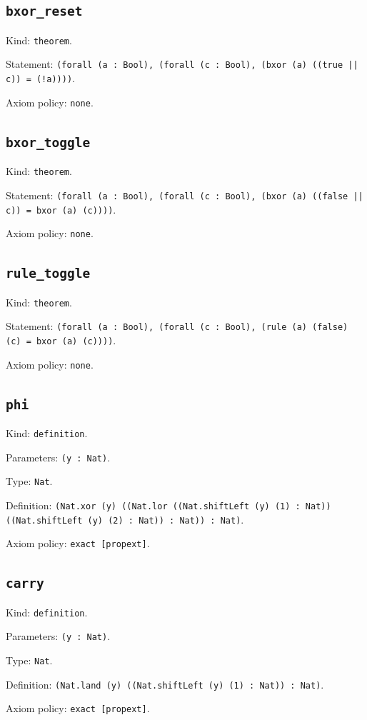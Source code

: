 \documentclass[11pt]{article}
\begin{document}
\subsection*{\texttt{bxor\_reset}}
\noindent Kind: \texttt{theorem}.\par
\noindent Statement: \texttt{(forall (a : Bool), (forall (c : Bool), (bxor (a) ((true || c)) = (!a))))}.\par
\noindent Axiom policy: \texttt{none}.\par
\subsection*{\texttt{bxor\_toggle}}
\noindent Kind: \texttt{theorem}.\par
\noindent Statement: \texttt{(forall (a : Bool), (forall (c : Bool), (bxor (a) ((false || c)) = bxor (a) (c))))}.\par
\noindent Axiom policy: \texttt{none}.\par
\subsection*{\texttt{rule\_toggle}}
\noindent Kind: \texttt{theorem}.\par
\noindent Statement: \texttt{(forall (a : Bool), (forall (c : Bool), (rule (a) (false) (c) = bxor (a) (c))))}.\par
\noindent Axiom policy: \texttt{none}.\par
\subsection*{\texttt{phi}}
\noindent Kind: \texttt{definition}.\par
\noindent Parameters: \texttt{(y : Nat)}.\par
\noindent Type: \texttt{Nat}.\par
\noindent Definition: \texttt{(Nat.xor (y) ((Nat.lor ((Nat.shiftLeft (y) (1) : Nat)) ((Nat.shiftLeft (y) (2) : Nat)) : Nat)) : Nat)}.\par
\noindent Axiom policy: \texttt{exact [propext]}.\par
\subsection*{\texttt{carry}}
\noindent Kind: \texttt{definition}.\par
\noindent Parameters: \texttt{(y : Nat)}.\par
\noindent Type: \texttt{Nat}.\par
\noindent Definition: \texttt{(Nat.land (y) ((Nat.shiftLeft (y) (1) : Nat)) : Nat)}.\par
\noindent Axiom policy: \texttt{exact [propext]}.\par
\end{document}
